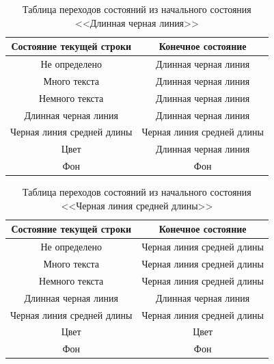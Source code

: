 \begin{table}[H]
    \centering
    \caption{Таблица переходов состояний из начального состояния <<Длинная черная линия>>}
    \label{tab:lbl}
    \begin{tabular}{|c|c|}
        \hline
        \textbf{Состояние текущей строки} & \textbf{Конечное состояние} \\ \hline
        Не определено & Длинная черная линия \\ \hline
        Много текста & Длинная черная линия \\ \hline
        Немного текста & Длинная черная линия \\ \hline
        Длинная черная линия & Длинная черная линия \\ \hline
        Черная линия средней длины & Черная линия средней длины \\ \hline
        Цвет & Длинная черная линия \\ \hline
        Фон & Фон \\ \hline
    \end{tabular}
\end{table}

\begin{table}[H]
    \centering
    \caption{Таблица переходов состояний из начального состояния <<Черная линия средней длины>>}
    \label{tab:mbl}
    \begin{tabular}{|c|c|}
        \hline
        \textbf{Состояние текущей строки} & \textbf{Конечное состояние} \\ \hline
        Не определено & Черная линия средней длины \\ \hline
        Много текста & Черная линия средней длины \\ \hline
        Немного текста & Черная линия средней длины \\ \hline
        Длинная черная линия & Длинная черная линия \\ \hline
        Черная линия средней длины & Черная линия средней длины \\ \hline
        Цвет & Цвет \\ \hline
        Фон & Фон \\ \hline
    \end{tabular}
\end{table}

